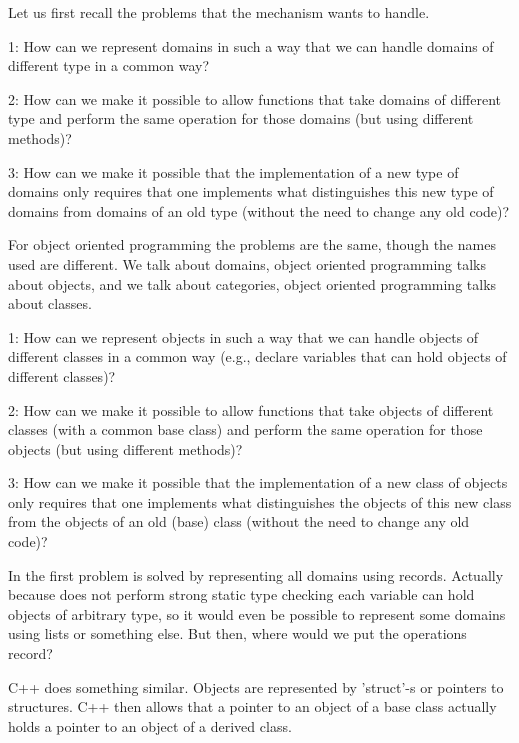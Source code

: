 Let us  first recall  the problems  that the  {\GAP} mechanism  wants  to
handle.

1:      How can we  represent  domains in such  a way that we can  handle
        domains of different type in a common way?

2:      How can we make it possible  to allow functions that take domains
        of  different  type  and  perform  the  same  operation for those
        domains (but using different methods)?

3:      How can we make it possible that the implementation of a new type
        of domains  only requires  that one implements what distinguishes
        this new type of domains from domains of an old type (without the
        need to change any old code)?

For object oriented programming the  problems are  the  same, though  the
names  used  are  different.   We talk  about  domains,  object  oriented
programming  talks about objects,  and  we  talk about categories, object
oriented programming talks about classes.

1:      How  can  we represent  objects in  such a way that we can handle
        objects  of different  classes  in a  common way  (e.g.,  declare
        variables that can hold objects of different classes)?

2:      How can we make it possible to allow functions that take  objects
        of  different classes (with a common base  class) and perform the
        same operation for those objects (but using different methods)?

3:      How can we  make it possible  that the implementation  of  a  new
        class   of  objects  only  requires   that  one  implements  what
        distinguishes the objects of  this new class from the  objects of
        an old (base) class (without the need to change any old code)?

In {\GAP}  the first problem  is solved by representing all domains using
records.   Actually because {\GAP} does  not  perform  strong static type
checking  each variable can  hold objects of  arbitrary type, so it would
even be possible to represent some domains using lists or something else.
But then, where would we put the operations record?

C++  does something  similar.  Objects  are represented by 'struct'-s  or
pointers to structures.  C++ then allows that a pointer to an object of a
base class actually holds a pointer to an object of a derived class.

